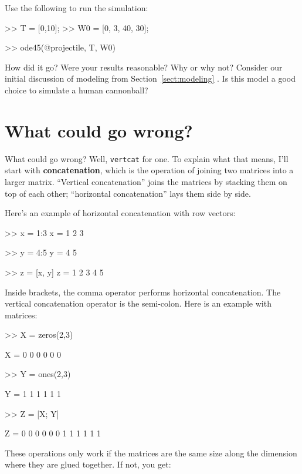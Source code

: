 \documentclass[
]{book}
\numberwithin{Answer}{chapter}
\numberwithin{Exercise}{chapter}
\begin{document}
Use the following to run the simulation:

\begin{code}
>> T = [0,10];            %
>> W0 = [0, 3, 40, 30];   %

>> ode45(@projectile, T, W0)
\end{code}

How did it go? Were your results reasonable? Why or why not? Consider our
initial discussion of modeling from Section~\ref{sect:modeling} . Is this
model a good choice to simulate a human cannonball?

\section{What could go wrong?}

What could go wrong?  Well, {\tt vertcat} for one.  To explain
what that means, I'll start with {\bf concatenation}, which is
the operation of joining two matrices into a larger matrix.
``Vertical concatenation'' joins the matrices by stacking them on
top of each other; ``horizontal concatenation'' lays them
side by side.

Here's an example of horizontal concatenation with row vectors:

\begin{code}
>> x = 1:3
x = 1     2     3

>> y = 4:5
y = 4     5

>> z = [x, y]
z = 1     2     3     4     5
\end{code}

Inside brackets, the comma operator performs horizontal concatenation.
The vertical concatenation operator is the semi-colon.  Here is an
example with matrices:

\begin{code}
>> X = zeros(2,3)

X =  0     0     0
     0     0     0

>> Y = ones(2,3)

Y =  1     1     1
     1     1     1

>> Z = [X; Y]

Z =  0     0     0
     0     0     0
     1     1     1
     1     1     1
\end{code}

These operations only work if the matrices are the same size along
the dimension where they are glued together.  If not, you get:
\end{document}
